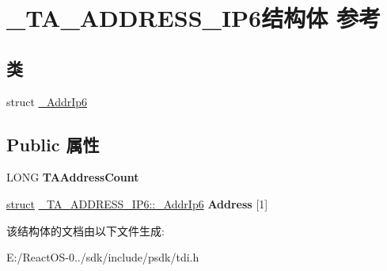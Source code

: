 \hypertarget{struct___t_a___a_d_d_r_e_s_s___i_p6}{}\section{\+\_\+\+T\+A\+\_\+\+A\+D\+D\+R\+E\+S\+S\+\_\+\+I\+P6结构体 参考}
\label{struct___t_a___a_d_d_r_e_s_s___i_p6}
\subsection*{类}
\begin{DoxyCompactItemize}
\item 
struct \hyperlink{struct___t_a___a_d_d_r_e_s_s___i_p6_1_1___addr_ip6}{\+\_\+\+Addr\+Ip6}
\end{DoxyCompactItemize}
\subsection*{Public 属性}
\begin{DoxyCompactItemize}
\item 
\mbox{\label{struct___t_a___a_d_d_r_e_s_s___i_p6_af39c7aa0c105bb4d6e2d7510ca5bffb8}} 
L\+O\+NG {\bfseries T\+A\+Address\+Count}
\item 
\mbox{\label{struct___t_a___a_d_d_r_e_s_s___i_p6_a7f3fbb1d6cb09c78c73ad20bfbb72baf}} 
\hyperlink{interfacestruct}{struct} \hyperlink{struct___t_a___a_d_d_r_e_s_s___i_p6_1_1___addr_ip6}{\+\_\+\+T\+A\+\_\+\+A\+D\+D\+R\+E\+S\+S\+\_\+\+I\+P6\+::\+\_\+\+Addr\+Ip6} {\bfseries Address} \mbox{[}1\mbox{]}
\end{DoxyCompactItemize}


该结构体的文档由以下文件生成\+:\begin{DoxyCompactItemize}
\item 
E\+:/\+React\+O\+S-\/0../sdk/include/psdk/tdi.\+h\end{DoxyCompactItemize}
